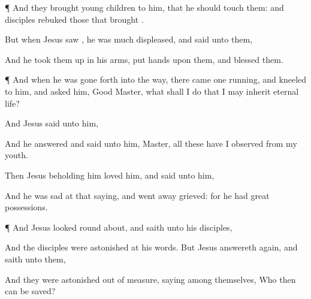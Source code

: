 {\par }{\PP {}¶
And they
brought young
children to
him,
that he should
touch
them:
and
{}
disciples
rebuked those that
brought
{}.

But
when
Jesus
saw
{}, he was much
displeased,
and
said unto
them,
{}


And he
took
them up in his
arms,
put
{}
hands
upon
them, and
blessed
them.


\par }{\PP {}¶
And
when
he was gone
forth
into the
way, there
came
one
running,
and
kneeled to
him, and
asked
him,
Good
Master,
what shall I
do
that I may
inherit
eternal
life?

And
Jesus
said unto
him,
{}


And he
answered and
said unto
him,
Master,
all
these have I
observed
from
my
youth.

Then
Jesus
beholding
him
loved
him,
and
said unto
him,
{}

And he was
sad
at that
saying, and went
away
grieved:
for
he
had
great
possessions.


\par }{\PP {}¶
And
Jesus looked round
about, and
saith
unto
his
disciples,
{}

And the
disciples were
astonished
at
his
words.
But
Jesus
answereth
again, and
saith unto
them,
{}


And they were
astonished out of
measure,
saying
among
themselves,
Who
then
can be
saved?

}
